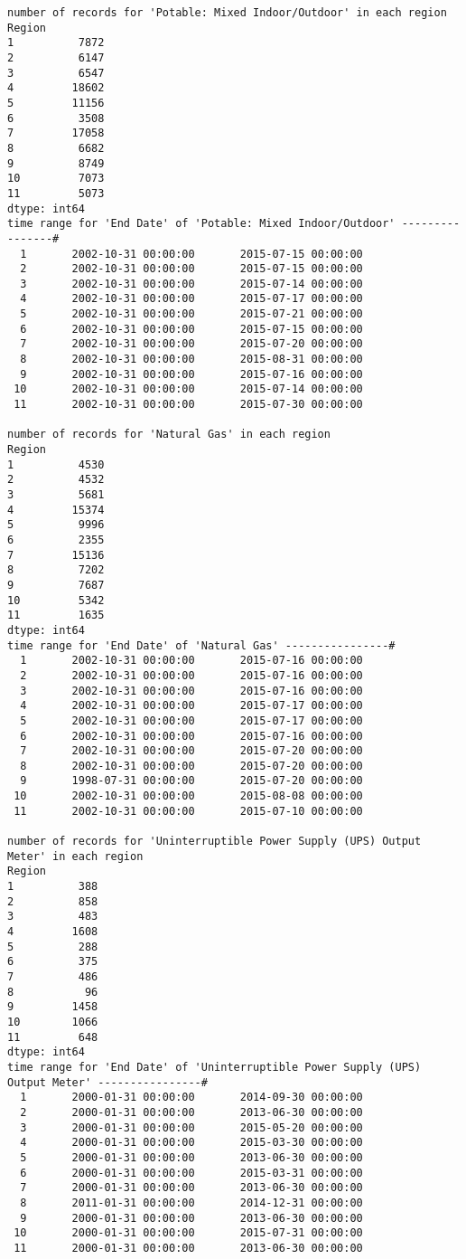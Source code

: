 \documentclass[12pt]{article}
\begin{document}
\begin{verbatim}
number of records for 'Potable: Mixed Indoor/Outdoor' in each region
Region
1          7872
2          6147
3          6547
4         18602
5         11156
6          3508
7         17058
8          6682
9          8749
10         7073
11         5073
dtype: int64
time range for 'End Date' of 'Potable: Mixed Indoor/Outdoor' ----------------#
  1       2002-10-31 00:00:00       2015-07-15 00:00:00
  2       2002-10-31 00:00:00       2015-07-15 00:00:00
  3       2002-10-31 00:00:00       2015-07-14 00:00:00
  4       2002-10-31 00:00:00       2015-07-17 00:00:00
  5       2002-10-31 00:00:00       2015-07-21 00:00:00
  6       2002-10-31 00:00:00       2015-07-15 00:00:00
  7       2002-10-31 00:00:00       2015-07-20 00:00:00
  8       2002-10-31 00:00:00       2015-08-31 00:00:00
  9       2002-10-31 00:00:00       2015-07-16 00:00:00
 10       2002-10-31 00:00:00       2015-07-14 00:00:00
 11       2002-10-31 00:00:00       2015-07-30 00:00:00

number of records for 'Natural Gas' in each region
Region
1          4530
2          4532
3          5681
4         15374
5          9996
6          2355
7         15136
8          7202
9          7687
10         5342
11         1635
dtype: int64
time range for 'End Date' of 'Natural Gas' ----------------#
  1       2002-10-31 00:00:00       2015-07-16 00:00:00
  2       2002-10-31 00:00:00       2015-07-16 00:00:00
  3       2002-10-31 00:00:00       2015-07-16 00:00:00
  4       2002-10-31 00:00:00       2015-07-17 00:00:00
  5       2002-10-31 00:00:00       2015-07-17 00:00:00
  6       2002-10-31 00:00:00       2015-07-16 00:00:00
  7       2002-10-31 00:00:00       2015-07-20 00:00:00
  8       2002-10-31 00:00:00       2015-07-20 00:00:00
  9       1998-07-31 00:00:00       2015-07-20 00:00:00
 10       2002-10-31 00:00:00       2015-08-08 00:00:00
 11       2002-10-31 00:00:00       2015-07-10 00:00:00

number of records for 'Uninterruptible Power Supply (UPS) Output Meter' in each region
Region
1          388
2          858
3          483
4         1608
5          288
6          375
7          486
8           96
9         1458
10        1066
11         648
dtype: int64
time range for 'End Date' of 'Uninterruptible Power Supply (UPS) Output Meter' ----------------#
  1       2000-01-31 00:00:00       2014-09-30 00:00:00
  2       2000-01-31 00:00:00       2013-06-30 00:00:00
  3       2000-01-31 00:00:00       2015-05-20 00:00:00
  4       2000-01-31 00:00:00       2015-03-30 00:00:00
  5       2000-01-31 00:00:00       2013-06-30 00:00:00
  6       2000-01-31 00:00:00       2015-03-31 00:00:00
  7       2000-01-31 00:00:00       2013-06-30 00:00:00
  8       2011-01-31 00:00:00       2014-12-31 00:00:00
  9       2000-01-31 00:00:00       2013-06-30 00:00:00
 10       2000-01-31 00:00:00       2015-07-31 00:00:00
 11       2000-01-31 00:00:00       2013-06-30 00:00:00


\end{verbatim}
\end{document}
